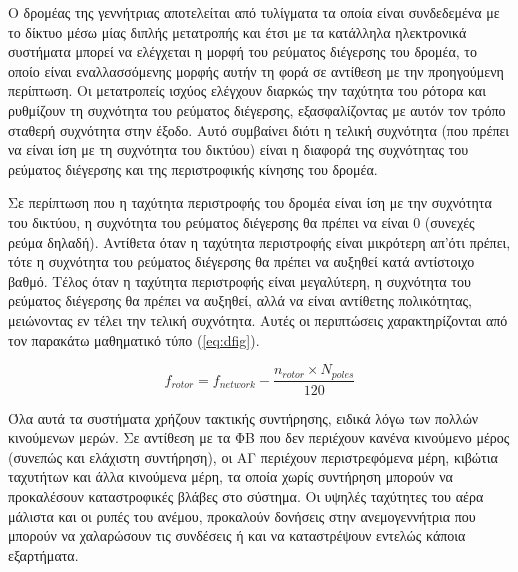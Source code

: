 \documentclass[12pt]{report}
\begin{document}
Ο δρομέας της γεννήτριας αποτελείται από τυλίγματα τα οποία είναι συνδεδεμένα με το δίκτυο μέσω μίας διπλής μετατροπής {} και έτσι με τα κατάλληλα ηλεκτρονικά συστήματα μπορεί να ελέγχεται η μορφή του ρεύματος
 διέγερσης του δρομέα, το οποίο είναι εναλλασσόμενης μορφής αυτήν τη φορά σε αντίθεση με την προηγούμενη περίπτωση. 
Οι μετατροπείς ισχύος ελέγχουν διαρκώς την ταχύτητα του ρότορα και ρυθμίζουν τη συχνότητα του ρεύματος διέγερσης, εξασφαλίζοντας με αυτόν τον τρόπο σταθερή συχνότητα στην έξοδο. Αυτό συμβαίνει διότι η τελική συχνότητα (που πρέπει
να είναι ίση με τη συχνότητα του δικτύου) είναι η διαφορά της συχνότητας του ρεύματος διέγερσης και της περιστροφικής κίνησης του δρομέα.

Σε περίπτωση που η ταχύτητα περιστροφής του δρομέα είναι ίση με την συχνότητα του δικτύου, η συχνότητα του ρεύματος διέγερσης θα πρέπει να είναι 0 (συνεχές ρεύμα δηλαδή). Αντίθετα όταν η ταχύτητα περιστροφής είναι μικρότερη απ'ότι
πρέπει, τότε η συχνότητα του ρεύματος διέγερσης θα πρέπει να αυξηθεί κατά αντίστοιχο βαθμό. Τέλος όταν η ταχύτητα περιστροφής είναι μεγαλύτερη, η συχνότητα του ρεύματος διέγερσης θα πρέπει να αυξηθεί, αλλά να είναι αντίθετης
πολικότητας, μειώνοντας εν τέλει την τελική συχνότητα. Αυτές οι περιπτώσεις χαρακτηρίζονται από τον παρακάτω μαθηματικό τύπο (\ref{eq:dfig}).

\begin{equation}
	f_{rotor} = f_{network} - \frac{n_{rotor} \times{} N_{poles}}{120}
	\label{eq:dfig}
\end{equation}

Όλα αυτά τα συστήματα χρήζουν τακτικής συντήρησης, ειδικά λόγω των πολλών κινούμενων μερών. Σε αντίθεση με τα ΦΒ που δεν περιέχουν κανένα κινούμενο μέρος (συνεπώς και ελάχιστη συντήρηση), οι ΑΓ περιέχουν περιστρεφόμενα μέρη, κιβώτια
ταχυτήτων και άλλα κινούμενα μέρη, τα οποία χωρίς συντήρηση μπορούν να προκαλέσουν καταστροφικές βλάβες στο σύστημα. Οι υψηλές ταχύτητες του αέρα μάλιστα και οι ρυπές του ανέμου, προκαλούν δονήσεις στην ανεμογεννήτρια που μπορούν να
χαλαρώσουν τις συνδέσεις ή και να καταστρέψουν εντελώς κάποια εξαρτήματα.
\end{document}

